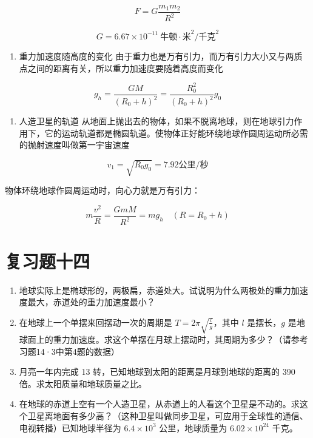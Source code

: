 \[
F=G\frac{m_1m_2}{R^2}
\]

\[
G=6.67\times10^{-11}\ \text{牛顿}\mathbin{\cdot}\text{米}^{2}/\text{千克}^{2}
\]

\begin{enumerate}
\def\labelenumi{\arabic{enumi}.}
\setcounter{enumi}{2}
\tightlist
\item
  重力加速度随高度的变化
  由于重力也是万有引力，而万有引力大小又与两质点之间的距离有关，所以重力加速度要随着高度而变化
\end{enumerate}

\[
g _ {h} = \frac {G M}{(R _ {0} + h) ^ {2}} = \frac {R _ {0} ^ {2}}{(R _ {0} + h) ^ {2}} g _ {0}
\]

\begin{enumerate}
\def\labelenumi{\arabic{enumi}.}
\setcounter{enumi}{3}
\tightlist
\item
  人造卫星的轨道
  从地面上抛出去的物体，如果不脱离地球，则在地球引力作用下，它的运动轨道都是椭圆轨道。使物体正好能环绕地球作圆周运动所必需的抛射速度叫做第一宇宙速度
\end{enumerate}

\[
v_1=\sqrt{R_0g_0}=7.92\text{公里/秒}
\]

物体环绕地球作圆周运动时，向心力就是万有引力：

\[
m \frac {v ^ {2}}{R} = \frac {G m M}{R ^ {2}} = m g _ {h} \quad (R = R _ {0} + h)
\]

\section{复习题十四}\label{ux590dux4e60ux9898ux5341ux56db}

\begin{enumerate}
\def\labelenumi{\arabic{enumi}.}
\item
  地球实际上是椭球形的，两极扁，赤道处大。试说明为什么两极处的重力加速度最大，赤道处的重力加速度最小？
\item
  在地球上一个单摆来回摆动一次的周期是
  \(T = 2\pi \sqrt{\frac{l}{g}}\)，其中 \(l\) 是摆长，\(g\)
  是地球面上的重力加速度。求这个单摆在月球上摆动时，其周期为多少？（请参考习题14·3中第4题的数据）
\item
  月亮一年内完成 13 转，已知地球到太阳的距离是月球到地球的距离的 390
  倍。求太阳质量和地球质量之比。
\item
  在地球的赤道上空有一个人造卫星，从赤道上的人看这个卫星是不动的。求这个卫星离地面有多少高？（这种卫星叫做同步卫星，可应用于全球性的通信、电视转播）已知地球半径为
  \(6.4 \times 10^{3}\) 公里，地球质量为 \(6.02 \times 10^{24}\) 千克。
\end{enumerate}

